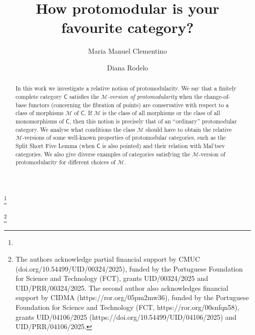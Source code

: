 \documentclass[11pt]{amsart}
\theoremstyle{plain}
\theoremstyle{definition}
\theoremstyle{remark}
\newcommand{\defn}[1]{\emph{#1}}
\newcommand{\C}{\ensuremath{\mathsf{C}}}
\newcommand{\M}{\ensuremath{\mathscr{M}}}
\begin{document}
\title{How protomodular is your favourite category?}

\author{Maria Manuel Clementino}
\address{CMUC, Department of Mathematics, University of
Coimbra, 3000-143 Coimbra, Portugal}\thanks{}


\author{Diana Rodelo}
\address{Department of Mathematics, University of the Algarve, 8005-139 Faro, Portugal and Center for Research and Development in Mathematics and Applications (CIDMA), Department of Mathematics, University of Aveiro, 3810-193 Aveiro, Portugal}
\thanks{The authors acknowledge partial financial support by CMUC (doi.org/10.54499/UID/00324/2025), funded by the Portuguese
Foundation for Science and Technology (FCT), grants UID/00324/2025 and UID/PRR/00324/2025. The second author also
acknowledges financial support by CIDMA (https://ror.org/05pm2mw36), funded by the Portuguese Foundation for Science
and Technology (FCT, https://ror.org/00snfqn58), grants UID/04106/2025 (https://doi.org/10.54499/UID/04106/2025) and
UID/PRR/04106/2025.
}




\begin{abstract} In this work we investigate a relative notion of protomodularity. We say that a finitely complete category $\C$ satisfies the \defn{$\M$-version of protomodularity} when the change-of-base functors (concerning the fibration of points) are conservative with respect to a class of morphisms $\M$ of $\C$. If $\M$ is the class of all morphisms or the class of all monomorphisms of $\C$, then this notion is precisely that of an ``ordinary'' protomodular category. We analyse what conditions the class $\M$ should have to obtain the relative $\M$-versions of some well-known properties of protomodular categories, such as the Split Short Five Lemma (when $\C$ is also pointed) and their relation with Mal'tsev categories. We also give diverse examples of categories satisfying the $\M$-version of protomodularity for different choices of $\M$.
\end{abstract}
\end{document}
